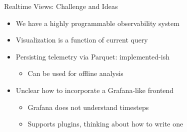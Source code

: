 \documentclass[
  ignorenonframetext,
]{beamer}
\providecommand{\tightlist}{%
  \setlength{\itemsep}{0pt}\setlength{\parskip}{0pt}}\usepackage{longtable,booktabs,array}
\begin{document}
\begin{frame}{Realtime Views: Challenge and Ideas}
\label{realtime-views-challenge-and-ideas}
\begin{itemize}
\tightlist
\item
  We have a highly programmable observability system
\item
  Visualization is a function of current query
\end{itemize}

\pause

\begin{itemize}
\tightlist
\item
  Persisting telemetry via Parquet: implemented-ish

  \begin{itemize}
  \tightlist
  \item
    Can be used for offline analysis
  \end{itemize}
\end{itemize}

\pause

\begin{itemize}
\tightlist
\item
  Unclear how to incorporate a Grafana-like frontend

  \begin{itemize}
  \tightlist
  \item
    Grafana does not understand timesteps
  \item
    Supports plugins, thinking about how to write one
  \end{itemize}
\end{itemize}
\end{frame}
\end{document}

